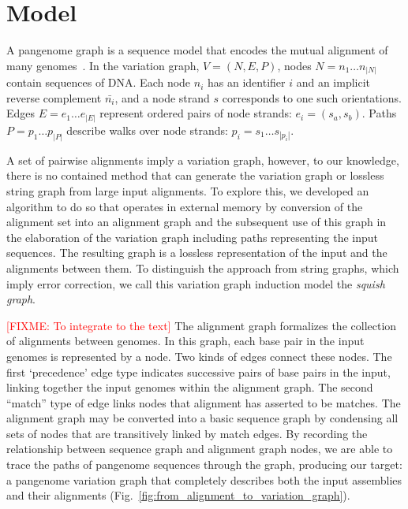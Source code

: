 \documentclass{bioinfo}
\newcommand{\red}[1]{{\textcolor{Red}{#1}}}
\newcommand{\FIXME}[1]{\red{[FIXME: #1]}}
\begin{document}
    \section{Model}
    \label{sec:model}
    A pangenome graph is a sequence model that encodes the mutual alignment of many genomes~\citep{Garrison_2019_thesis,Eizenga_2020}.
    In the variation graph, $V = (N, E, P)$, nodes $N = n_1\ldots n_{|N|}$ contain sequences of DNA.
    Each node $n_i$ has an identifier $i$ and an implicit reverse complement $\bar{n_i}$, and a node strand $s$ corresponds to one such orientations.
    Edges $E = e_1\ldots e_{|E|}$ represent ordered pairs of node strands: $e_i = ( s_a, s_b )$.
    Paths $P = p_1\ldots p_{|P|}$ describe walks over node strands: $p_i = s_1 \ldots s_{|p_i|}$.

    A set of pairwise alignments imply a variation graph, however, to our knowledge, there is no contained method that can
    generate the variation graph or lossless string graph from large input alignments.
    To explore this, we developed an algorithm to do so that operates in external memory by conversion of the alignment
    set into an alignment graph and the subsequent use of this graph in the elaboration of the variation graph including paths representing the input sequences.
    The resulting graph is a lossless representation of the input and the alignments between them.
    To distinguish the approach from string graphs, which imply error correction, we call this variation graph induction model the \emph{squish graph}.

    \FIXME{To integrate to the text} The alignment graph formalizes the collection of alignments between genomes.
    In this graph, each base pair in the input genomes is represented by a node.
    Two kinds of edges connect these nodes.
    The first `precedence' edge type indicates successive pairs of base pairs in the input,
    linking together the input genomes within the alignment graph.
    The second “match” type of edge links nodes that alignment has asserted to be matches.
    The alignment graph may be converted into a basic sequence graph by condensing all sets of nodes that are transitively linked by match edges.
    By recording the relationship between sequence graph and alignment graph nodes, we are able to trace the paths of pangenome sequences through the
    graph, producing our target: a pangenome variation graph that completely describes both the input assemblies and their alignments (Fig.~\ref{fig:from_alignment_to_variation_graph}).
\end{document}

